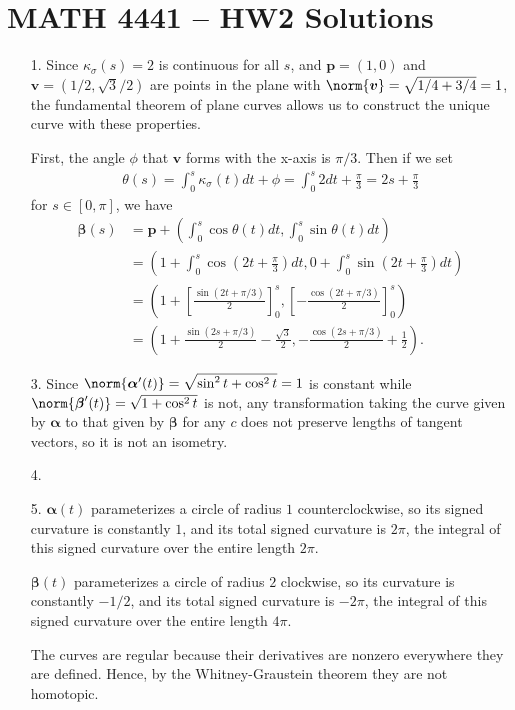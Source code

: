 \documentclass[a4paper,12pt]{article}
\newcommand{\bs}{\boldsymbol}
\theoremstyle{remark}
\begin{document}
\section*{MATH 4441 -- HW2 Solutions}
\begin{enumerate}
    \item[1.]
        Since $\kappa_\sigma(s) = 2$ is continuous for all $s$, and $\bs{p} = (1, 0)$ and $\bs{v} = (1/2, \sqrt{3}/2)$ are points in the plane with $\norm{\bs{v}} = \sqrt{1/4 + 3/4} = 1$, the fundamental theorem of plane curves allows us to construct the unique curve with these properties. \par
        First, the angle $\phi$ that $\bs{v}$ forms with the x-axis is $\pi/3$. Then if we set
        \begin{align*}
            \theta(s) = \int_0^s \kappa_\sigma(t)dt + \phi = \int_0^s 2dt + \frac{\pi}{3} = 2s + \frac{\pi}{3}
        \end{align*}
        for $s \in [0, \pi]$, we have
        \begin{align*}
            \bs{\beta}(s) &= \bs{p} + \left( \int_0^s \cos\theta(t)dt, \int_0^s \sin\theta(t)dt \right) \\
            &= \left( 1 + \int_0^s \cos(2t + \frac{\pi}{3})dt, 0 + \int_0^s \sin(2t + \frac{\pi}{3})dt \right) \\
            &= \left( 1 + \left[ \frac{\sin(2t + \pi/3)}{2} \right]_0^s, \left[ -\frac{\cos(2t + \pi/3)}{2} \right]_0^s \right) \\
            &= \left( 1 + \frac{\sin(2s + \pi/3)}{2} - \frac{\sqrt{3}}{2}, -\frac{\cos(2s + \pi/3)}{2} + \frac{1}{2} \right).
        \end{align*}

    \item[3.]
        Since $\norm{\bs{\alpha}'(t)} = \sqrt{\sin^2 t + \cos^2 t} = 1$ is constant while $\norm{\bs{\beta}'(t)} = \sqrt{1 + \cos^2 t}$ is not, any transformation taking the curve given by $\bs{\alpha}$ to that given by $\bs{\beta}$ for any $c$ does not preserve lengths of tangent vectors, so it is not an isometry.

    \item[4.]

    \item[5.]
        $\bs{\alpha}(t)$ parameterizes a circle of radius $1$ counterclockwise, so its signed curvature is constantly $1$, and its total signed curvature is $2\pi$, the integral of this signed curvature over the entire length $2\pi$. \par
        $\bs{\beta}(t)$ parameterizes a circle of radius $2$ clockwise, so its curvature is constantly $-1/2$, and its total signed curvature is $-2\pi$, the integral of this signed curvature over the entire length $4\pi$. \par
        The curves are regular because their derivatives are nonzero everywhere they are defined. Hence, by the Whitney-Graustein theorem they are not homotopic.


\end{enumerate}
\end{document}
